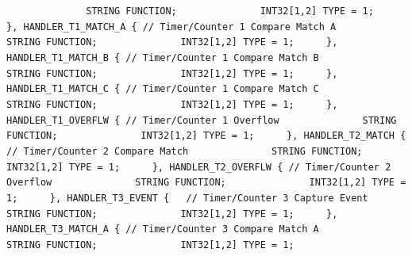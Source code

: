 {{{{\lstinline!              STRING FUNCTION;! \newline
\lstinline!              INT32[1,2] TYPE = 1;! \newline
\lstinline!	    }, HANDLER_T1_MATCH_A {	// Timer/Counter 1 Compare Match A! \newline
\lstinline!              STRING FUNCTION;! \newline
\lstinline!              INT32[1,2] TYPE = 1;! \newline
\lstinline!	    }, HANDLER_T1_MATCH_B {	// Timer/Counter 1 Compare Match B! \newline
\lstinline!              STRING FUNCTION;! \newline
\lstinline!              INT32[1,2] TYPE = 1;! \newline
\lstinline!	    }, HANDLER_T1_MATCH_C {	// Timer/Counter 1 Compare Match C! \newline
\lstinline!              STRING FUNCTION;! \newline
\lstinline!              INT32[1,2] TYPE = 1;! \newline
\lstinline!	    }, HANDLER_T1_OVERFLW {	// Timer/Counter 1 Overflow! \newline
\lstinline!              STRING FUNCTION;! \newline
\lstinline!              INT32[1,2] TYPE = 1;! \newline
\lstinline!	    }, HANDLER_T2_MATCH {	// Timer/Counter 2 Compare Match! \newline
\lstinline!              STRING FUNCTION;! \newline
\lstinline!              INT32[1,2] TYPE = 1;! \newline
\lstinline!	    }, HANDLER_T2_OVERFLW {	// Timer/Counter 2 Overflow! \newline
\lstinline!              STRING FUNCTION;! \newline
\lstinline!              INT32[1,2] TYPE = 1;! \newline
\lstinline!	    }, HANDLER_T3_EVENT {	// Timer/Counter 3 Capture Event! \newline
\lstinline!              STRING FUNCTION;! \newline
\lstinline!              INT32[1,2] TYPE = 1;! \newline
\lstinline!	    }, HANDLER_T3_MATCH_A {	// Timer/Counter 3 Compare Match A! \newline
\lstinline!              STRING FUNCTION;! \newline
\lstinline!              INT32[1,2] TYPE = 1;! \newline
}}}}
